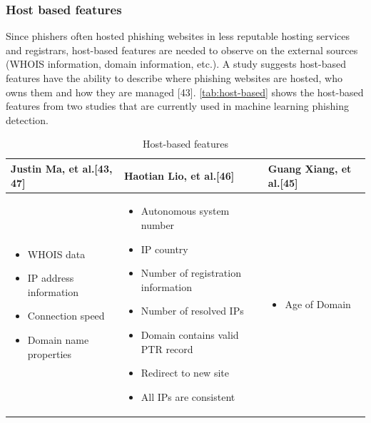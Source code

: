 \subsubsection{Host based features}

Since phishers often hosted phishing websites in less reputable hosting
services and registrars, host-based features are needed to observe
on the external sources (WHOIS information, domain information, etc.).
A study suggests host-based features have the ability to describe
where phishing websites are hosted, who owns them and how they are
managed {[}43{]}. \autoref{tab:host-based} shows the host-based features
from two studies that are currently used in machine learning phishing
detection. 

\begin{table}
\begin{tabular}{>{\raggedright}p{3cm}>{\raggedright}p{5cm}>{\raggedright}p{3cm}}
\toprule 
\textbf{\footnotesize{}Justin Ma, et al.{[}43, 47{]}} & \textbf{\footnotesize{}Haotian Lio, et al.{[}46{]}} & \textbf{\footnotesize{}Guang Xiang, et al.{[}45{]}}\tabularnewline
\midrule
\midrule 
\begin{itemize}
\item {\scriptsize{}WHOIS data}{\scriptsize \par}
\item {\scriptsize{}IP address information}{\scriptsize \par}
\item {\scriptsize{}Connection speed}{\scriptsize \par}
\item {\scriptsize{}Domain name properties }\end{itemize}
 & \begin{itemize}
\item {\scriptsize{}Autonomous system number }{\scriptsize \par}
\item {\scriptsize{}IP country}{\scriptsize \par}
\item {\scriptsize{}Number of registration information}{\scriptsize \par}
\item {\scriptsize{}Number of resolved IPs}{\scriptsize \par}
\item {\scriptsize{}Domain contains valid PTR record}{\scriptsize \par}
\item {\scriptsize{}Redirect to new site}{\scriptsize \par}
\item {\scriptsize{}All IPs are consistent}\end{itemize}
 & \begin{itemize}
\item {\scriptsize{}Age of Domain}\end{itemize}
\tabularnewline
\bottomrule
\end{tabular}\protect\caption{\label{tab:host-based}Host-based features}
\end{table}


